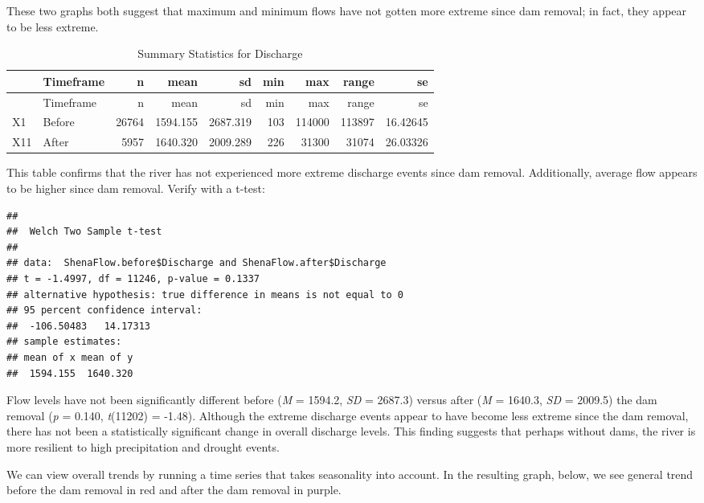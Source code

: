 \documentclass[
  12pt,
]{article}
\begin{document}
These two graphs both suggest that maximum and minimum flows have not
gotten more extreme since dam removal; in fact, they appear to be less
extreme.

\newpage

\begin{longtable}[]{@{}llrrrrrrr@{}}
\caption{Summary Statistics for Discharge}\tabularnewline
\toprule
& Timeframe & n & mean & sd & min & max & range & se \\
\midrule
\endfirsthead
\toprule
& Timeframe & n & mean & sd & min & max & range & se \\
\midrule
\endhead
X1 & Before & 26764 & 1594.155 & 2687.319 & 103 & 114000 & 113897 &
16.42645 \\
X11 & After & 5957 & 1640.320 & 2009.289 & 226 & 31300 & 31074 &
26.03326 \\
\bottomrule
\end{longtable}

This table confirms that the river has not experienced more extreme
discharge events since dam removal. Additionally, average flow appears
to be higher since dam removal. Verify with a t-test:

\begin{verbatim}
## 
##  Welch Two Sample t-test
## 
## data:  ShenaFlow.before$Discharge and ShenaFlow.after$Discharge
## t = -1.4997, df = 11246, p-value = 0.1337
## alternative hypothesis: true difference in means is not equal to 0
## 95 percent confidence interval:
##  -106.50483   14.17313
## sample estimates:
## mean of x mean of y 
##  1594.155  1640.320
\end{verbatim}

Flow levels have not been significantly different before (\emph{M} =
1594.2, \emph{SD} = 2687.3) versus after (\emph{M} = 1640.3, \emph{SD} =
2009.5) the dam removal (\emph{p} = 0.140, \emph{t}(11202) = -1.48).
Although the extreme discharge events appear to have become less extreme
since the dam removal, there has not been a statistically significant
change in overall discharge levels. This finding suggests that perhaps
without dams, the river is more resilient to high precipitation and
drought events.

\newpage

We can view overall trends by running a time series that takes
seasonality into account. In the resulting graph, below, we see general
trend before the dam removal in red and after the dam removal in purple.
\end{document}
